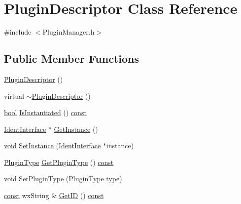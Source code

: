 \hypertarget{class_plugin_descriptor}{}\section{Plugin\+Descriptor Class Reference}
\label{class_plugin_descriptor}


{\ttfamily \#include $<$Plugin\+Manager.\+h$>$}

\subsection*{Public Member Functions}
\begin{DoxyCompactItemize}
\item 
\hyperlink{class_plugin_descriptor_a7af716f3d482251560e858b3319cbec5}{Plugin\+Descriptor} ()
\item 
virtual \hyperlink{class_plugin_descriptor_a42849221b072c62552082871273e8fa6}{$\sim$\+Plugin\+Descriptor} ()
\item 
\hyperlink{mac_2config_2i386_2lib-src_2libsoxr_2soxr-config_8h_abb452686968e48b67397da5f97445f5b}{bool} \hyperlink{class_plugin_descriptor_ad6feb3611b68ae1f7939926a9a59d86b}{Is\+Instantiated} () \hyperlink{getopt1_8c_a2c212835823e3c54a8ab6d95c652660e}{const} 
\item 
\hyperlink{class_ident_interface}{Ident\+Interface} $\ast$ \hyperlink{class_plugin_descriptor_afb8c769c85737a54f18b117226dcf90a}{Get\+Instance} ()
\item 
\hyperlink{sound_8c_ae35f5844602719cf66324f4de2a658b3}{void} \hyperlink{class_plugin_descriptor_a8191b1476dea3c5ea2ba5282d2e401da}{Set\+Instance} (\hyperlink{class_ident_interface}{Ident\+Interface} $\ast$instance)
\item 
\hyperlink{_plugin_manager_8h_a54e0db21fd49ff6e0178b6ebe120a6d2}{Plugin\+Type} \hyperlink{class_plugin_descriptor_a3beb408234ca73d3a28c8ad1cea98456}{Get\+Plugin\+Type} () \hyperlink{getopt1_8c_a2c212835823e3c54a8ab6d95c652660e}{const} 
\item 
\hyperlink{sound_8c_ae35f5844602719cf66324f4de2a658b3}{void} \hyperlink{class_plugin_descriptor_ad151da050a163f76b726b730c64df173}{Set\+Plugin\+Type} (\hyperlink{_plugin_manager_8h_a54e0db21fd49ff6e0178b6ebe120a6d2}{Plugin\+Type} type)
\item 
\hyperlink{getopt1_8c_a2c212835823e3c54a8ab6d95c652660e}{const} wx\+String \& \hyperlink{class_plugin_descriptor_ae5a3524df3239aa976c45a376eddbb0f}{Get\+ID} () \hyperlink{getopt1_8c_a2c212835823e3c54a8ab6d95c652660e}{const} 

\end{DoxyCompactItemize}
